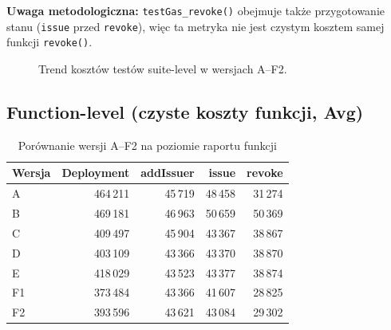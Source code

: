 \documentclass[11pt,a4paper]{article}
\begin{document}
\noindent
\textbf{Uwaga metodologiczna:} \texttt{testGas\_revoke()} obejmuje także przygotowanie stanu (\texttt{issue} przed \texttt{revoke}), więc ta metryka nie jest czystym kosztem samej funkcji \texttt{revoke()}.

\begin{figure}[h]
\centering
{}
\caption{Trend kosztów testów suite-level w wersjach A--F2.}
\end{figure}

\subsection{Function-level (czyste koszty funkcji, Avg)}
\begin{table}[h]
\centering
\caption{Porównanie wersji A--F2 na poziomie raportu funkcji}
\begin{tabular}{lrrrr}
\toprule
Wersja & Deployment & addIssuer & issue & revoke \\
\midrule
A  & 464\,211 & 45\,719 & 48\,458 & 31\,274 \\
B  & 469\,181 & 46\,963 & 50\,659 & 50\,369 \\
C  & 409\,497 & 45\,904 & 43\,367 & 38\,867 \\
D  & 403\,109 & 43\,366 & 43\,370 & 38\,870 \\
E  & 418\,029 & 43\,523 & 43\,377 & 38\,874 \\
F1 & 373\,484 & 43\,366 & 41\,607 & 28\,825 \\
F2 & 393\,596 & 43\,621 & 43\,084 & 29\,302 \\
\bottomrule
\end{tabular}
\end{table}
\end{document}
